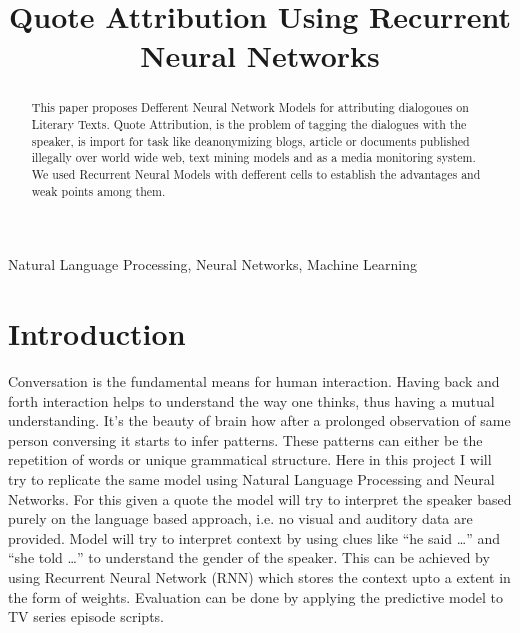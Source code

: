 \documentclass[conference]{IEEEtran}
\begin{document}
%
\title{Quote Attribution Using Recurrent Neural Networks}


\author{
}


\maketitle

\begin{abstract}
This paper proposes Defferent Neural Network Models for attributing dialogoues on Literary Texts. Quote Attribution, is the problem of tagging the dialogues with the speaker, is import for task like deanonymizing blogs, article or documents published illegally over world wide web, text mining models and as a media monitoring system. We used Recurrent Neural Models with defferent cells to establish the advantages and weak points among them.
\end{abstract}
\begin{IEEEkeywords}
Natural Language Processing, Neural Networks, Machine Learning
\end{IEEEkeywords}

\IEEEpeerreviewmaketitle


\section{Introduction}
Conversation is the fundamental means for human interaction. Having back and forth interaction helps to understand the way one thinks, thus having a mutual understanding. It’s the beauty of brain how after a prolonged observation of same person conversing it starts to infer patterns. These patterns can either be the repetition of words or unique grammatical structure.
Here  in this project I will try to replicate the same model using Natural Language Processing and Neural Networks. For this given a quote the model will try to interpret the speaker based purely on the language based approach, i.e. no visual and auditory data are provided. Model will try to interpret context by using clues like “he said …” and “she told …” to understand the gender of the speaker. This can be achieved by using Recurrent Neural Network (RNN) which stores the context upto a extent in the form of weights. Evaluation can be done by applying the predictive model to TV series episode scripts. 
\end{document}
